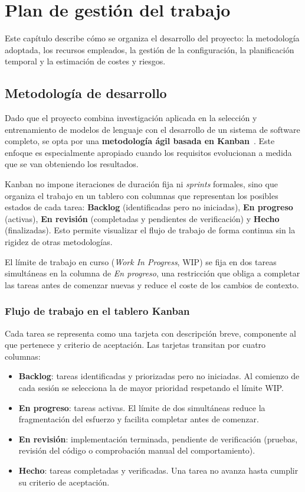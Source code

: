 \chapter{Plan de gestión del trabajo}\label{cap:Planificacion}

Este capítulo describe cómo se organiza el desarrollo del proyecto: la metodología adoptada, los recursos empleados, la gestión de la configuración, la planificación temporal y la estimación de costes y riesgos.

\section{Metodología de desarrollo}

Dado que el proyecto combina investigación aplicada en la selección y entrenamiento de modelos de lenguaje con el desarrollo de un sistema de software completo, se opta por una \textbf{metodología ágil basada en Kanban}~\cite{Vijayasarathy16}. Este enfoque es especialmente apropiado cuando los requisitos evolucionan a medida que se van obteniendo los resultados.

Kanban no impone iteraciones de duración fija ni \emph{sprints} formales, sino que organiza el trabajo en un tablero con columnas que representan los posibles estados de cada tarea: \textbf{Backlog} (identificadas pero no iniciadas), \textbf{En progreso} (activas), \textbf{En revisión} (completadas y pendientes de verificación) y \textbf{Hecho} (finalizadas). Esto permite visualizar el flujo de trabajo de forma continua sin la rigidez de otras metodologías.

El límite de trabajo en curso (\emph{Work In Progress}, WIP) se fija en dos tareas simultáneas en la columna de \emph{En progreso}, una restricción que obliga a completar las tareas antes de comenzar nuevas y reduce el coste de los cambios de contexto.

\subsection{Flujo de trabajo en el tablero Kanban}

Cada tarea se representa como una tarjeta con descripción breve, componente al que pertenece y criterio de aceptación. Las tarjetas transitan por cuatro columnas:

\begin{itemize}
 \item \textbf{Backlog}: tareas identificadas y priorizadas pero no iniciadas. Al comienzo de cada sesión se selecciona la de mayor prioridad respetando el límite WIP.
 \item \textbf{En progreso}: tareas activas. El límite de dos simultáneas reduce la fragmentación del esfuerzo y facilita completar antes de comenzar.
 \item \textbf{En revisión}: implementación terminada, pendiente de verificación (pruebas, revisión del código o comprobación manual del comportamiento).
 \item \textbf{Hecho}: tareas completadas y verificadas. Una tarea no avanza hasta cumplir su criterio de aceptación.
\end{itemize}

